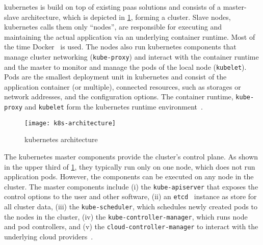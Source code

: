   \Gls{kubernetes} is build on top of existing \gls{paas} solutions and consists of a master-slave architecture, which is depicted in \cref{fig:kubernetes-architecture}, forming a cluster.
  Slave nodes, \gls{kubernetes} calls them only \enquote{nodes}, are responsible for executing and maintaining the actual application via an underlying container runtime.
  Most of the time Docker~\cite{docker} is used.
  The nodes also run \gls{kubernetes} components that manage cluster networking (\texttt{kube-proxy}) and interact with the container runtime and the master to monitor and manage the pods of the local node (\texttt{kubelet}).
  Pods are the smallest deployment unit in \gls{kubernetes} and consist of the application container (or multiple), connected resources, such as storages or network addresses, and the configuration options.
  The container runtime, \texttt{kube-proxy} and \texttt{kubelet} form the \gls{kubernetes} runtime environment~\cite{kubernetes}.

  \begin{figure}
    \centering
    \texttt{[image: k8s-architecture]}
    \caption{\Gls{kubernetes} architecture}
    \label{fig:kubernetes-architecture}
  \end{figure}

  The \gls{kubernetes} master components provide the cluster's control plane.
  As shown in the upper third of \cref{fig:kubernetes-architecture}, they typically run only on one node, which does not run application pods.
  However, the components can be executed on any node in the cluster.
  The master components include
  (i) the \texttt{kube-apiserver} that exposes the control options to the user and other software,
  (ii) an \texttt{etcd}~\cite{etcd} instance as store for all cluster data,
  (iii) the \texttt{kube-scheduler}, which schedules newly created pods to the nodes in the cluster,
  (iv) the \texttt{kube-controller-manager}, which runs node and pod controllers, and
  (v) the \texttt{cloud-controller-manager} to interact with the underlying cloud providers~\cite{kubernetes}.

